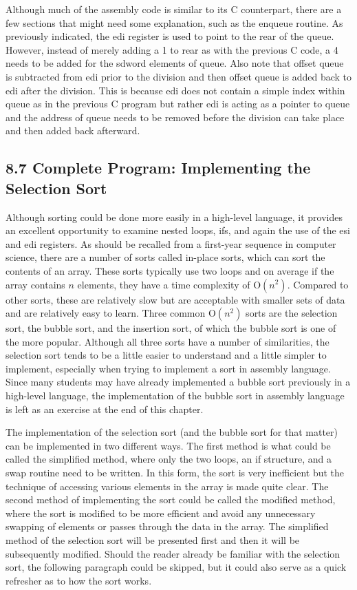 \documentclass[10pt]{article}
\begin{document}
Although much of the assembly code is similar to its C counterpart, there are a few sections that might need some explanation, such as the enqueue routine. As previously indicated, the edi register is used to point to the rear of the queue. However, instead of merely adding a 1 to rear as with the previous C code, a 4\\
needs to be added for the sdword elements of queue. Also note that offset queue is subtracted from edi prior to the division and then offset queue is added back to edi after the division. This is because edi does not contain a simple index within queue as in the previous C program but rather edi is acting as a pointer to queue and the address of queue needs to be removed before the division can take place and then added back afterward.

\subsection*{8.7 Complete Program: Implementing the Selection Sort}
Although sorting could be done more easily in a high-level language, it provides an excellent opportunity to examine nested loops, ifs, and again the use of the esi and edi registers. As should be recalled from a first-year sequence in computer science, there are a number of sorts called in-place sorts, which can sort the contents of an array. These sorts typically use two loops and on average if the array contains $n$ elements, they have a time complexity of $\mathrm{O}\left(n^{2}\right)$. Compared to other sorts, these are relatively slow but are acceptable with smaller sets of data and are relatively easy to learn. Three common $\mathrm{O}\left(n^{2}\right)$ sorts are the selection sort, the bubble sort, and the insertion sort, of which the bubble sort is one of the more popular. Although all three sorts have a number of similarities, the selection sort tends to be a little easier to understand and a little simpler to implement, especially when trying to implement a sort in assembly language. Since many students may have already implemented a bubble sort previously in a high-level language, the implementation of the bubble sort in assembly language is left as an exercise at the end of this chapter.

The implementation of the selection sort (and the bubble sort for that matter) can be implemented in two different ways. The first method is what could be called the simplified method, where only the two loops, an if structure, and a swap routine need to be written. In this form, the sort is very inefficient but the technique of accessing various elements in the array is made quite clear. The second method of implementing the sort could be called the modified method, where the sort is modified to be more efficient and avoid any unnecessary swapping of elements or passes through the data in the array. The simplified method of the selection sort will be presented first and then it will be subsequently modified. Should the reader already be familiar with the selection sort, the following paragraph could be skipped, but it could also serve as a quick refresher as to how the sort works.
\end{document}
